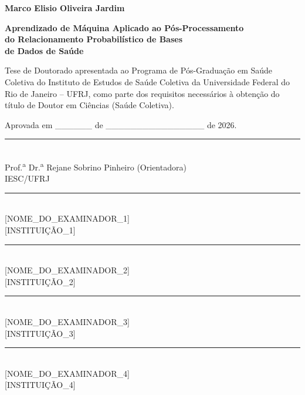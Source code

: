 \documentclass[12pt,a4paper,openany]{book}
\begin{document}
\newpage

\thispagestyle{empty}

\noindent
\setlength{\headheight}{15pt}

\begin{center}

{\large \bf Marco Elisio Oliveira Jardim}

\vspace{20pt}

{\Large \bf Aprendizado de M\'aquina Aplicado ao P\'os-Processamento\\do Relacionamento Probabil\'istico de Bases\\de Dados de Sa\'ude}

\vspace{25pt}

\parbox{12cm}{\centering Tese de Doutorado apresentada ao Programa de P\'os-Gradua\c{c}\~ao em Sa\'ude Coletiva do Instituto de Estudos de Sa\'ude Coletiva da Universidade Federal do Rio de Janeiro -- UFRJ, como parte dos requisitos necess\'arios \`a obten\c{c}\~ao do t\'itulo de Doutor em Ci\^encias (Sa\'ude Coletiva).}

\vspace{25pt}

Aprovada em \_\_\_\_\_\_ de \_\_\_\_\_\_\_\_\_\_\_\_\_\_\_\_ de 2026.

\end{center}

\vspace{35pt}

\begin{center}
\rule{10cm}{0.5pt}\\
Prof.\textsuperscript{a} Dr.\textsuperscript{a} Rejane Sobrino Pinheiro (Orientadora)\\
IESC/UFRJ

\vspace{25pt}

\rule{10cm}{0.5pt}\\
{[NOME\_DO\_EXAMINADOR\_1]}\\
{[INSTITUIÇÃO\_1]}

\vspace{25pt}

\rule{10cm}{0.5pt}\\
{[NOME\_DO\_EXAMINADOR\_2]}\\
{[INSTITUIÇÃO\_2]}

\vspace{25pt}

\rule{10cm}{0.5pt}\\
{[NOME\_DO\_EXAMINADOR\_3]}\\
{[INSTITUIÇÃO\_3]}

\vspace{25pt}

\rule{10cm}{0.5pt}\\
{[NOME\_DO\_EXAMINADOR\_4]}\\
{[INSTITUIÇÃO\_4]}

\end{center}
\end{document}
